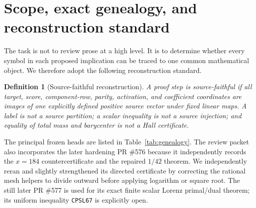 \documentclass[11pt]{article}
\newtheorem{definition}[theorem]{Definition}
\newcommand{\1}{\mathbf 1}
\begin{document}
\noindent{}

\tableofcontents

\section{Scope, exact genealogy, and reconstruction standard}

The task is not to review prose at a high level.  It is to determine whether every symbol in each proposed implication can be traced to one common mathematical object.  We therefore adopt the following reconstruction standard.

\begin{definition}[Source-faithful reconstruction]
A proof step is \emph{source-faithful} if all target, score, component-row, parity, activation, and coefficient coordinates are images of one explicitly defined positive source vector under fixed linear maps.  A label is not a source partition; a scalar inequality is not a source injection; and equality of total mass and barycenter is not a Hall certificate.
\end{definition}

The principal frozen heads are listed in Table~\ref{tab:genealogy}.  The review packet also incorporates the later hardening PR \#576 because it independently records the $x=184$ countercertificate and the repaired $1/42$ theorem.  We independently reran and slightly strengthened its directed certificate by correcting the rational mesh helpers to divide outward before applying logarithm or square root.  The still later PR \#577 is used for its exact finite scalar Lorenz primal/dual theorem; its uniform inequality \texttt{CPSL67} is explicitly open.
\end{document}
